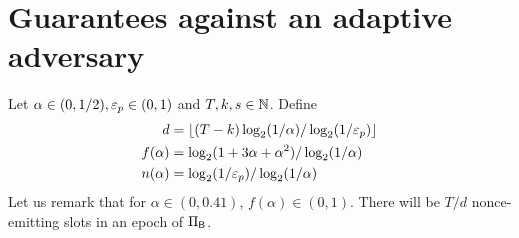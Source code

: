 \section{Guarantees against an adaptive adversary}

Let $\alpha \in (0, 1/2), \mathsf{\varepsilon}_p \in (0, 1)$ and $T, k, s \in \mathbb{N}$.
Define 
\begin{align}
    d &= \lfloor (T - k) \log_2(1/\alpha)/\log_2(1/\mathsf{\varepsilon}_p)\rfloor \label{eq:d-multiepoch}\\
    f(\alpha) &= \log_2(1 + 3 \alpha + \alpha^2)/\log_2(1/\alpha) \label{eq:f-poisson} \\
    n(\alpha) &= \log_2(1/\mathsf{\varepsilon}_p)/\log_2(1/\alpha) \label{eq:n-poisson} 
\end{align}
Let us remark that for $\alpha \in (0, 0.41)$, $f(\alpha) \in (0,1)$. 
There will be $T/d$ nonce-emitting slots in an epoch of $\Pi_{\mathsf{B}}$. 


